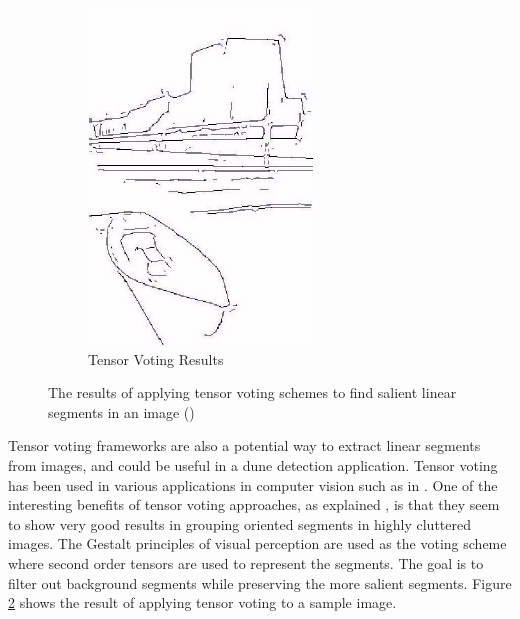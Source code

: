 \begin{figure}
\begin{subfigure}{0.35\textwidth}
		\includegraphics[width=\linewidth]{figures/tensor_voting}
		\caption{ Tensor Voting Results }
		\label{fig:tensor_voting_output}
	\end{subfigure}
	\caption{ The results of applying tensor voting schemes to find salient linear segments in an image (\cite{2009_tensor_voting_cluttered_backgrounds}) }
	\label{fig:tensor_voting_results}
\end{figure}

Tensor voting frameworks are also a potential way to extract linear segments from images, and could be useful in a dune detection application. Tensor voting has been used in various applications in computer vision such as in \cite{2006_tensor_voting_video_repairing,2005_tensor_voting_image_correction,2006_tensor_voting_stereo_monocular,2005_tensor_voting_visual_motion_analysis,2001_tensor_voting_epipolar_geometry}. One of the interesting benefits of tensor voting approaches, as explained \cite{2009_tensor_voting_cluttered_backgrounds}, is that they seem to show very good results in grouping oriented segments in highly cluttered images. The Gestalt principles of visual perception are used as the voting scheme where second order tensors are used to represent the segments. The goal is to filter out background segments while preserving the more salient segments. Figure \ref{fig:tensor_voting_results} shows the result of applying tensor voting to a sample image.

